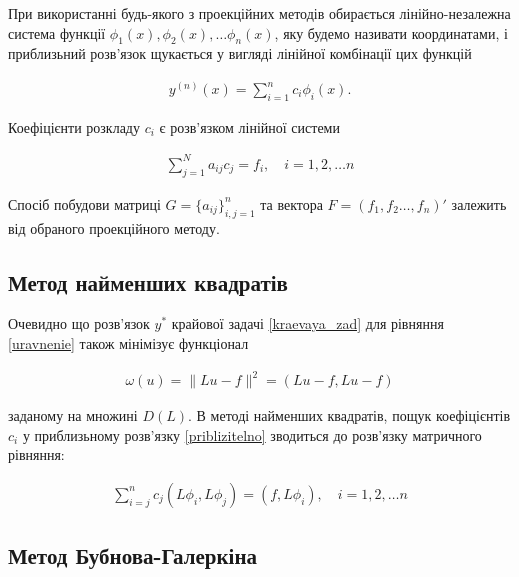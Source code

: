 При використанні будь-якого з проекційних методів обирається лінійно-незалежна система функції $\phi_1(x), \phi_2(x), \dots \phi_n(x)$, яку будемо називати координатами, і приблизьний розв'язок щукається у вигляді лінійної комбінації цих функцій

\begin{equation} \label{priblizitelno}
\begin{split}
y^{(n)}(x) = \sum_{i=1}^n {c_i \phi_i (x)}.
\end{split}					
\end{equation}

Коефіцієнти розкладу $c_i$ є розв'язком лінійної системи

\begin{equation} 
\begin{split}
\sum_{j=1}^N {a_{ij} c_j = f_i}, \quad i = 1, 2, \dots n
\end{split}					
\end{equation}

Спосіб побудови матриці $G = \{ a_{ij} \}_{i,j = 1}^{n} $ та вектора $F = (f_1, f_2 \dots, f_n)'$ залежить від обраного проекційного методу.

\subsection{Метод найменших квадратів}

Очевидно що розв'язок $y^*$ крайової задачі \ref{kraevaya_zad} для рівняння \ref{uravnenie} також мінімізує функціонал 

\begin{equation} 
\begin{split}
\omega(u) = \| Lu - f \|^2 = (Lu - f, Lu - f)
\end{split}					
\end{equation}

заданому на множині $D(L)$. В методі найменших квадратів, пощук коефіцієнтів $c_i$ у приблизьному розв'язку \ref{priblizitelno} зводиться до розв'язку матричного рівняння:

\begin{equation} 
\begin{split}
\sum_{i=j}^{n} c_j (L\phi_i, L\phi_j) = (f, L\phi_i), \quad i = 1, 2, \dots n
\end{split}					
\end{equation}

\subsection{Метод Бубнова-Галеркіна}


